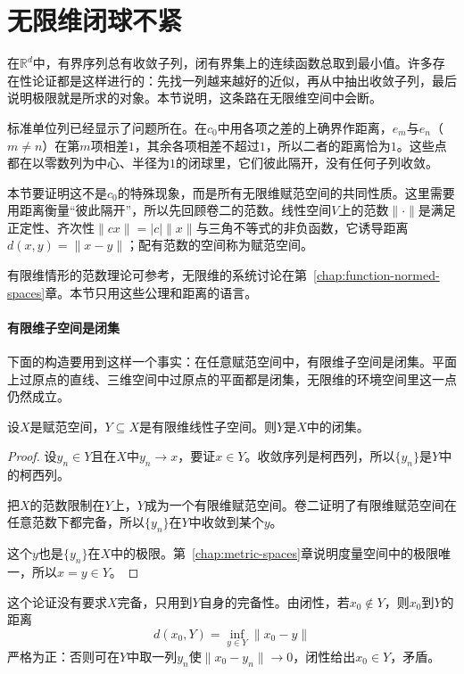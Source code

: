 \section{无限维闭球不紧}
\label{sec:fvec-closed-ball-noncompact}

在$\mathbb R^d$中，有界序列总有收敛子列，闭有界集上的连续函数总取到最小值。许多存在性论证都是这样进行的：先找一列越来越好的近似，再从中抽出收敛子列，最后说明极限就是所求的对象。本节说明，这条路在无限维空间中会断。

标准单位列已经显示了问题所在。在$c_0$中用各项之差的上确界作距离，$e_m$与$e_n$（$m\neq n$）在第$m$项相差$1$，其余各项相差不超过$1$，所以二者的距离恰为$1$。这些点都在以零数列为中心、半径为$1$的闭球里，它们彼此隔开，没有任何子列收敛。

本节要证明这不是$c_0$的特殊现象，而是所有无限维赋范空间的共同性质。这里需要用距离衡量“彼此隔开”，所以先回顾卷二的范数。线性空间$V$上的范数$\lVert\cdot\rVert$是满足正定性、齐次性$\lVert cx\rVert=\lvert c\rvert\lVert x\rVert$与三角不等式的非负函数，它诱导距离$d(x,y)=\lVert x-y\rVert$；配有范数的空间称为赋范空间。

有限维情形的范数理论可参考，无限维的系统讨论在第~\ref{chap:function-normed-spaces}章。本节只用这些公理和距离的语言。

\paragraph{有限维子空间是闭集}
下面的构造要用到这样一个事实：在任意赋范空间中，有限维子空间是闭集。平面上过原点的直线、三维空间中过原点的平面都是闭集，无限维的环境空间里这一点仍然成立。

\begin{lemma}[有限维子空间闭性]
\label{lem:fvec-finite-subspace-closed}
设$X$是赋范空间，$Y\subseteq X$是有限维线性子空间。则$Y$是$X$中的闭集。
\end{lemma}

\begin{proof}
设$y_n\in Y$且在$X$中$y_n\to x$，要证$x\in Y$。收敛序列是柯西列，所以$\{y_n\}$是$Y$中的柯西列。

把$X$的范数限制在$Y$上，$Y$成为一个有限维赋范空间。卷二证明了有限维赋范空间在任意范数下都完备，所以$\{y_n\}$在$Y$中收敛到某个$y$。

这个$y$也是$\{y_n\}$在$X$中的极限。第~\ref{chap:metric-spaces}章说明度量空间中的极限唯一，所以$x=y\in Y$。
\end{proof}

这个论证没有要求$X$完备，只用到$Y$自身的完备性。由闭性，若$x_0\notin Y$，则$x_0$到$Y$的距离
\[
 d(x_0,Y)=\inf_{y\in Y}\lVert x_0-y\rVert
\]
严格为正：否则可在$Y$中取一列$y_n$使$\lVert x_0-y_n\rVert\to0$，闭性给出$x_0\in Y$，矛盾。

